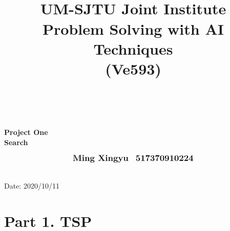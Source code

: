 \documentclass{article}
\title{\hrulefill\\
\bf\LARGE{UM-SJTU Joint Institute\\Problem Solving with AI Techniques \\(Ve593)\\ \hrulefill\\}}
\author{}
\date{}
\begin{document}
\maketitle
{\centering
\vspace{1.5cm}
{\bf\LARGE{Project One\\Search\\}
\vspace{3.5cm}}

\begin{equation*}
    \begin{array}{lr}
       \large\textbf{Ming Xingyu}  & \large\textbf{517370910224}\\
    \end{array}
\end{equation*}

\vspace{5.5cm}
\hrulefill\\Date: 2020/10/11\\}


\large
\newpage
\thispagestyle{empty}
\large
\newpage
\section*{Part 1. TSP}
\end{document}
